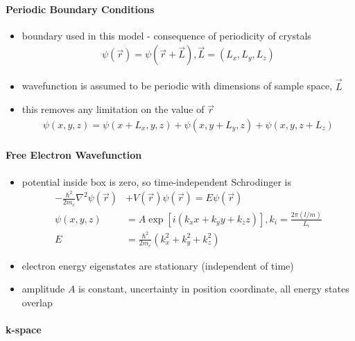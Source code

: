 \documentclass[a4paper,11pt,normalem]{article}
\begin{document}
\paragraph{Periodic Boundary Conditions}

\begin{itemize}
    \item boundary used in this model - consequence of periodicity of crystals
        \begin{align*}
            \psi(\vec{r}) = \psi(\vec{r}+\vec{L}), \vec{L} = (L_x,L_y,L_z)
        \end{align*}
    \item wavefunction is assumed to be periodic with dimensions of sample space, \(\vec{L}\)
    \item this removes any limitation on the value of \(\vec{r}\)
        \begin{align*}
            \psi(x,y,z) = \psi(x+L_x,y,z) + \psi(x,y+L_y,z) + \psi(x,y,z+L_z)
        \end{align*}
\end{itemize}

\paragraph{Free Electron Wavefunction}

\begin{itemize}
    \item potential inside box is zero, so time-independent Schrodinger is
        \begin{align*}
            -\frac{\hbar^2}{2m_e}\nabla^2\psi(\vec{r}) &+ V(\vec{r})\psi(\vec{r}) = E\psi(\vec{r})\\
            \psi(x,y,z) &= A\exp\left[i(k_xx + k_yy + k_zz)\right], k_i = \frac{2\pi(l/m)}{L_i}\\
            E &= \frac{\hbar^2}{2m_e}\left(k_x^2 + k_y^2 + k_z^2\right)
        \end{align*}
    \item electron energy eigenstates are stationary (independent of time)
    \item amplitude \(A\) is constant, uncertainty in position coordinate, all energy states overlap
\end{itemize}

\paragraph{k-space}
\end{document}
